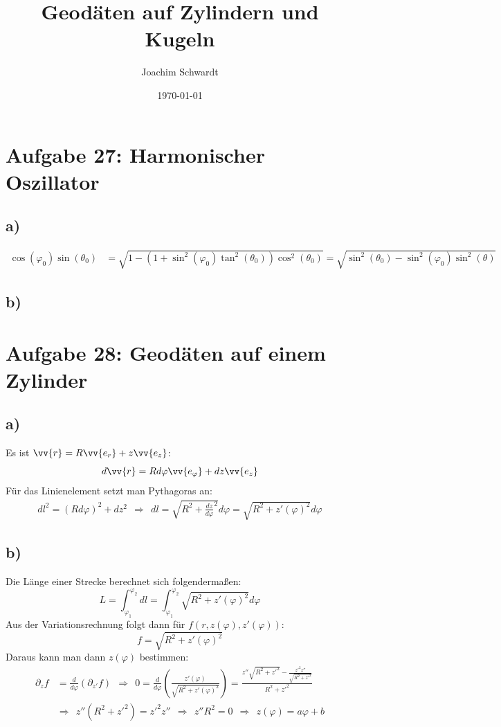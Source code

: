 \documentclass[a4paper,12pt]{article}
\begin{document}
\title{Geodäten auf Zylindern und Kugeln}
\author{Joachim Schwardt}
\date{\today}
\maketitle

\section*{Aufgabe 27: Harmonischer Oszillator}
\subsection*{a)}
\begin{align*}
\cos(\varphi_0)\sin(\theta_0)&=\sqrt{1-(1+\sin^2(\varphi_0)\tan^2(\theta_0))\cos^2(\theta_0)}=\sqrt{\sin^2(\theta_0)-\sin^2(\varphi_0)\sin^2(\theta)}
\end{align*}
\subsection*{b)}
\section*{Aufgabe 28: Geodäten auf einem Zylinder}
\subsection*{a)}
Es ist $\vv{r}=R\vv{e_r}+z\vv{e_z}$:
$$d\vv{r}=Rd\varphi\vv{e_{\varphi}}+dz\vv{e_z}$$
Für das Linienelement setzt man Pythagoras an:
\begin{align*}
dl^2=(Rd\varphi)^2+dz^2\ \ \Rightarrow\ \ dl = \sqrt{R^2+\frac{dz}{d\varphi}^2}d\varphi = \sqrt{R^2+z'(\varphi)^2}d\varphi
\end{align*}
\subsection*{b)}
Die Länge einer Strecke berechnet sich folgendermaßen:
$$ L=\int_{\varphi_1}^{\varphi_2}dl=\int_{\varphi_1}^{\varphi_2}\sqrt{R^2+z'(\varphi)^2}d\varphi $$
Aus der Variationsrechnung folgt dann für $f(r, z(\varphi),  z'(\varphi))$:
$$f=\sqrt{R^2+z'(\varphi)^2}$$
Daraus kann man dann $z(\varphi)$ bestimmen:
\begin{align*}
\partial_zf&=\frac{d}{d\varphi}(\partial_{z'}f)\ \ \Rightarrow\ \ 0 = \frac{d}{d\varphi}\left(\frac{z'(\varphi)}{\sqrt{R^2+z'(\varphi)^2}}\right) = \frac{z''\sqrt{R^2+z'^2}-\frac{z'^2z''}{\sqrt{R^2+z'^2}}}{R^2+z'^2}\\
&\Rightarrow\ \ z''(R^2+z'^2) = z'^2z''\ \ \Rightarrow\ \ z''R^2 = 0\ \ \Rightarrow\ \ z(\varphi) = a\varphi +b
\end{align*}
\end{document}
